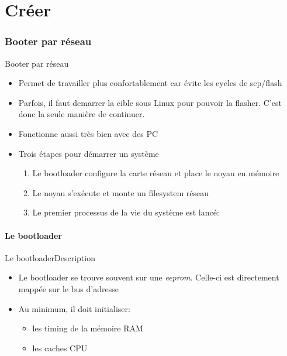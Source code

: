 %
%

\part{Créer}

\begin{frame}
  \partpage
\end{frame}

\begin{frame}
  \tableofcontents
\end{frame}

\section{Booter par réseau}

\begin{frame}{Booter par réseau}
  \begin{itemize}
  \item Permet de travailler  plus confortablement car évite les cycles
    de scp/flash
  \item Parfois, il faut demarrer  la cible sous Linux pour pouvoir la
    flasher.  C'est donc la seule manière de continuer.
  \item Fonctionne aussi très bien avec des PC
  \item Trois étapes pour démarrer un système
    \begin{enumerate}
    \item Le bootloader configure la carte réseau et place le noyau en
      mémoire
    \item Le noyau s'exécute et monte un filesystem réseau
    \item Le premier processus de la vie du système est lancé: 
    \end{enumerate}
    \end{itemize}
\end{frame}

\subsection{Le bootloader}

\begin{frame}[fragile=singleslide]{Le bootloader}{Description}
  \begin{itemize}
  \item    Le    bootloader     se    trouve    souvent    sur    une
    \emph{eeprom}.  Celle-ci   est  directement  mappée   sur  le  bus
    d'adresse
  \item Au minimum, il doit initialiser:
    \begin{itemize}
    \item les timing de la mémoire RAM
    \item les caches CPU
    \end{itemize}
  \end{itemize}
\end{frame}

